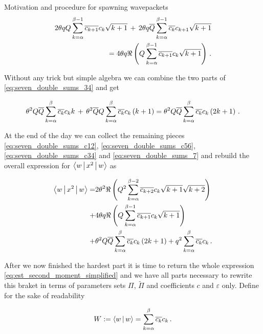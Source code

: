 \begin{chapter}{Motivation and procedure for spawning wavepackets}
\begin{align} \label{eq:seven_double_sums_c56}
  2\theta qQ \sum_{k=\alpha}^{\beta-1} \overline{c_{k+1}} c_{k} \sqrt{k+1}
  \, + \, 2\theta q\overline{Q} \sum_{k=\alpha}^{\beta-1} \overline{c_k} c_{k+1} \sqrt{k+1} \nonumber \\
  = 4 \theta q \Re \left( Q \sum_{k=\alpha}^{\beta-1} \overline{c_{k+1}} c_{k} \sqrt{k+1} \right) \,.
\end{align}

Without any trick but simple algebra we can combine the two parts of \eqref{eq:seven_double_sums_34}
and get

\begin{equation} \label{eq:seven_double_sums_c34}
  \theta^2 Q\overline{Q} \sum_{k=\alpha}^\beta \overline{c_k} c_k k
  \, + \, \theta^2 \overline{Q}Q \sum_{k=\alpha}^\beta \overline{c_k} c_k \left(k+1\right)
  = \theta^2 Q\overline{Q} \sum_{k=\alpha}^\beta \overline{c_k} c_k \left(2k+1\right) \,.
\end{equation}

At the end of the day we can collect the remaining pieces \eqref{eq:seven_double_sums_c12},
\eqref{eq:seven_double_sums_c56}, \eqref{eq:seven_double_sums_c34} and \eqref{eq:seven_double_sums_7}
and rebuild the overall expression for $\Braket{w|x^2|w}$ as

\begin{equation} \label{eq:x2_braket}
\begin{split}
  \Braket{w|x^2|w}
  = & 2 \theta^2 \Re \left( Q^2 \sum_{k=\alpha}^{\beta-2} \overline{c_{k+2}} c_{k} \sqrt{k+1} \sqrt{k+2} \right) \\
  + & 4 \theta q \Re \left( Q \sum_{k=\alpha}^{\beta-1} \overline{c_{k+1}} c_{k} \sqrt{k+1} \right) \\
  + & \theta^2 Q\overline{Q} \sum_{k=\alpha}^\beta \overline{c_k} c_k \left(2k+1\right)
  + q^2 \sum_{k=\alpha}^\beta \overline{c_k} c_k \,.
\end{split}
\end{equation}

After we now finished the hardest part it is time to return the whole expression
\eqref{eq:est_second_moment_simplified} and we have all parts necessary to rewrite
this braket in terms of parameters sets $\Pi$, $\tilde{\Pi}$ and coefficients $c$
and $\varepsilon$ only. Define for the sake of readability

\begin{equation}
  W := \Braket{w|w} = \sum_{k=\alpha}^\beta \overline{c_k} c_k \,.
\end{equation}


\end{chapter}
